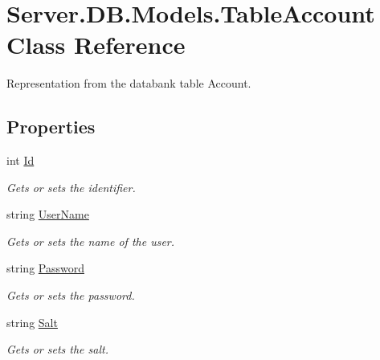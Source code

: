\hypertarget{classServer_1_1DB_1_1Models_1_1TableAccount}{}\section{Server.\+D\+B.\+Models.\+Table\+Account Class Reference}
\label{classServer_1_1DB_1_1Models_1_1TableAccount}


Representation from the databank table Account.  


\subsection*{Properties}
\begin{DoxyCompactItemize}
\item 
int \hyperlink{classServer_1_1DB_1_1Models_1_1TableAccount_a2bc49cfaddd688fde3be961d9491bdae}{Id}
\begin{DoxyCompactList}\small\item\em Gets or sets the identifier. \end{DoxyCompactList}\item 
string \hyperlink{classServer_1_1DB_1_1Models_1_1TableAccount_ad35a3a996444afd590e747e4e4064100}{User\+Name}
\begin{DoxyCompactList}\small\item\em Gets or sets the name of the user. \end{DoxyCompactList}\item 
string \hyperlink{classServer_1_1DB_1_1Models_1_1TableAccount_ae2e067ab09522520d715b4cf51386cd9}{Password}
\begin{DoxyCompactList}\small\item\em Gets or sets the password. \end{DoxyCompactList}\item 
string \hyperlink{classServer_1_1DB_1_1Models_1_1TableAccount_a5d4782aec9c4515ec3158831df9048af}{Salt}
\begin{DoxyCompactList}\small\item\em Gets or sets the salt. \end{DoxyCompactList}\end{DoxyCompactItemize}


